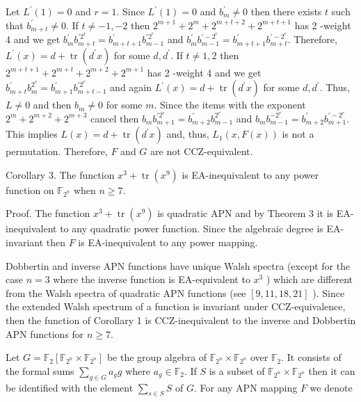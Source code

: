 \documentclass[10pt]{article}
\begin{document}
Let $L^{\prime}(1)=0$ and $r=1$. Since $L^{\prime}(1)=0$ and $b_{m}^{\prime} \neq 0$ then there exists $t$ such that $b_{m+t}^{\prime} \neq 0$. If $t \neq-1,-2$ then $2^{m+1}+2^{m}+2^{m+t+2}+2^{m+t+1}$ has 2 -weight 4 and we get $b_{m}^{\prime} b_{m+t}^{\prime 2^{r}}=b_{m+t+1}^{\prime} b_{m-1}^{\prime 2^{r}}$ and $b_{m}^{\prime} b_{m-1}^{\prime-2^{r}}=b_{m+t+1}^{\prime} b_{m+t}^{\prime-2^{r}}$. Therefore, $L^{\prime}(x)=d+\operatorname{tr}\left(d^{\prime} x\right)$ for some $d, d^{\prime}$. If $t \neq 1,2$ then $2^{m+t+1}+2^{m+t}+ 2^{m+2}+2^{m+1}$ has 2 -weight 4 and we get $b_{m+t}^{\prime} b_{m}^{2^{r}}=b_{m+1}^{\prime} b_{m+t-1}^{\prime 2^{r}}$ and again $L^{\prime}(x)=d+\operatorname{tr}\left(d^{\prime} x\right)$ for some $d, d^{\prime}$. Thus, $L \neq 0$ and then $b_{m} \neq 0$ for some $m$. Since the items with the exponent $2^{m}+2^{m+2}+2^{m+3}$ cancel then $b_{m} b_{m+1}^{\prime 2^{r}}=b_{m+2}^{\prime} b_{m-1}^{2^{r}}$ and $b_{m} b_{m-1}^{-2^{r}}=b_{m+2}^{\prime} b_{m+1}^{\prime-2^{r}}$. This implies $L(x)=d+\operatorname{tr}\left(d^{\prime} x\right)$ and, thus, $L_{1}(x, F(x))$ is not a permutation. Therefore, $F$ and $G$ are not CCZ-equivalent.

Corollary 3. The function $x^{3}+\operatorname{tr}\left(x^{9}\right)$ is EA-inequivalent to any power function on $\mathbb{F}_{2^{n}}$ when $n \geqslant 7$.

Proof. The function $x^{3}+\operatorname{tr}\left(x^{9}\right)$ is quadratic APN and by Theorem 3 it is EA-inequivalent to any quadratic power function. Since the algebraic degree is EA-invariant then $F$ is EA-inequivalent to any power mapping.

Dobbertin and inverse APN functions have unique Walsh spectra (except for the case $n=3$ where the inverse function is EA-equivalent to $x^{3}$ ) which are different from the Walsh spectra of quadratic APN functions (see $[9,11,18,21]$ ). Since the extended Walsh spectrum of a function is invariant under CCZ-equivalence, then the function of Corollary 1 is CCZ-inequivalent to the inverse and Dobbertin APN functions for $n \geqslant 7$.

Let $G=\mathbb{F}_{2}\left[\mathbb{F}_{2^{n}} \times \mathbb{F}_{2^{n}}\right]$ be the group algebra of $\mathbb{F}_{2^{n}} \times \mathbb{F}_{2^{n}}$ over $\mathbb{F}_{2}$. It consists of the formal sums $\sum_{g \in G} a_{g} g$ where $a_{g} \in \mathbb{F}_{2}$. If $S$ is a subset of $\mathbb{F}_{2^{n}} \times \mathbb{F}_{2^{n}}$ then it can be identified with the element $\sum_{s \in S} S$ of $G$. For any APN mapping $F$ we denote
\end{document}
